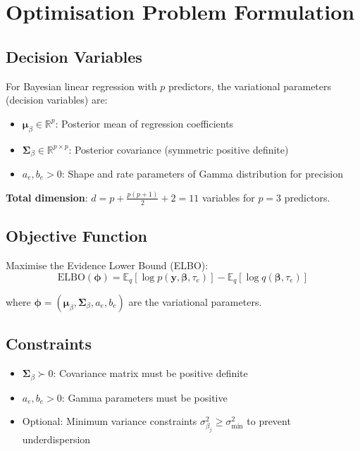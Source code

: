 \documentclass[11pt]{article}
\newcommand{\E}{\mathbb{E}}
\newcommand{\R}{\mathbb{R}}
\newcommand{\ELBO}{\text{ELBO}}
\begin{document}
\section*{Optimisation Problem Formulation}

\subsection*{Decision Variables}

For Bayesian linear regression with $p$ predictors, the variational parameters (decision variables) are:
\begin{itemize}
\item $\bm{\mu}_\beta \in \R^p$: Posterior mean of regression coefficients
\item $\bm{\Sigma}_\beta \in \R^{p \times p}$: Posterior covariance (symmetric positive definite)
\item $a_e, b_e > 0$: Shape and rate parameters of Gamma distribution for precision
\end{itemize}

\textbf{Total dimension}: $d = p + \frac{p(p+1)}{2} + 2 = 11$ variables for $p=3$ predictors.

\subsection*{Objective Function}

Maximise the Evidence Lower Bound (ELBO):
\begin{equation}
\ELBO(\bm{\phi}) = \E_q[\log p(\bm{y}, \bm{\beta}, \tau_e)] - \E_q[\log q(\bm{\beta}, \tau_e)]
\end{equation}

where $\bm{\phi} = (\bm{\mu}_\beta, \bm{\Sigma}_\beta, a_e, b_e)$ are the variational parameters.

\subsection*{Constraints}

\begin{itemize}
\item $\bm{\Sigma}_\beta \succ 0$: Covariance matrix must be positive definite
\item $a_e, b_e > 0$: Gamma parameters must be positive
\item Optional: Minimum variance constraints $\sigma^2_{\beta_j} \geq \sigma^2_{\text{min}}$ to prevent underdispersion
\end{itemize}
\end{document}
